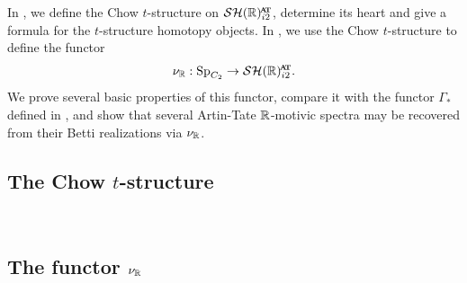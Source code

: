 In , we define the Chow $t$-structure on $\SHRat$, determine its heart and give a formula for the $t$-structure homotopy objects.
In , we use the Chow $t$-structure to define the functor
\[\nur : \Sp_{C_2} \to \SHRat.\]
We prove several basic properties of this functor, compare it with the functor $\Gamma_*$ defined in , and show that several Artin-Tate $\mathbb{R}$-motivic spectra may be recovered from their Betti realizations via $\nu_{\mathbb{R}}$.
%
%
%
\subsection{The Chow $t$-structure} \label{sec:chow}\ 



\subsection{The functor $\nu_{\mathbb{R}}$} \label{sec:nu}\ 



